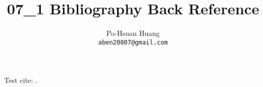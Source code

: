 \documentclass[12pt, a4paper]{article}
\title{07\_1 Bibliography Back Reference}
\author{Po-Hsuan Huang\\ 
    \texttt{aben20807@gmail.com}
}
\renewcommand{\cite}{\autocite}
\begin{document}
\maketitle

Test cite: \cite{XXX, huang2021tonic, huang2022pops, huang2023securetvm}.

\FloatBarrier
\printbibliography[%
    heading=bibintoc,
    title={References}
]
\end{document}

